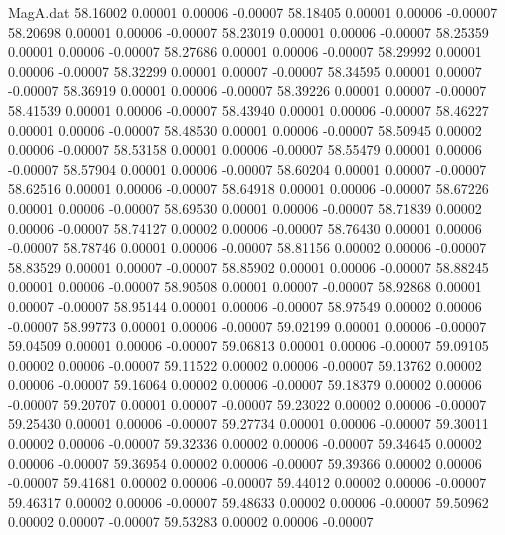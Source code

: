 \begin{filecontents}{MagA.dat}
  58.16002    0.00001    0.00006   -0.00007
  58.18405    0.00001    0.00006   -0.00007
  58.20698    0.00001    0.00006   -0.00007
  58.23019    0.00001    0.00006   -0.00007
  58.25359    0.00001    0.00006   -0.00007
  58.27686    0.00001    0.00006   -0.00007
  58.29992    0.00001    0.00006   -0.00007
  58.32299    0.00001    0.00007   -0.00007
  58.34595    0.00001    0.00007   -0.00007
  58.36919    0.00001    0.00006   -0.00007
  58.39226    0.00001    0.00007   -0.00007
  58.41539    0.00001    0.00006   -0.00007
  58.43940    0.00001    0.00006   -0.00007
  58.46227    0.00001    0.00006   -0.00007
  58.48530    0.00001    0.00006   -0.00007
  58.50945    0.00002    0.00006   -0.00007
  58.53158    0.00001    0.00006   -0.00007
  58.55479    0.00001    0.00006   -0.00007
  58.57904    0.00001    0.00006   -0.00007
  58.60204    0.00001    0.00007   -0.00007
  58.62516    0.00001    0.00006   -0.00007
  58.64918    0.00001    0.00006   -0.00007
  58.67226    0.00001    0.00006   -0.00007
  58.69530    0.00001    0.00006   -0.00007
  58.71839    0.00002    0.00006   -0.00007
  58.74127    0.00002    0.00006   -0.00007
  58.76430    0.00001    0.00006   -0.00007
  58.78746    0.00001    0.00006   -0.00007
  58.81156    0.00002    0.00006   -0.00007
  58.83529    0.00001    0.00007   -0.00007
  58.85902    0.00001    0.00006   -0.00007
  58.88245    0.00001    0.00006   -0.00007
  58.90508    0.00001    0.00007   -0.00007
  58.92868    0.00001    0.00007   -0.00007
  58.95144    0.00001    0.00006   -0.00007
  58.97549    0.00002    0.00006   -0.00007
  58.99773    0.00001    0.00006   -0.00007
  59.02199    0.00001    0.00006   -0.00007
  59.04509    0.00001    0.00006   -0.00007
  59.06813    0.00001    0.00006   -0.00007
  59.09105    0.00002    0.00006   -0.00007
  59.11522    0.00002    0.00006   -0.00007
  59.13762    0.00002    0.00006   -0.00007
  59.16064    0.00002    0.00006   -0.00007
  59.18379    0.00002    0.00006   -0.00007
  59.20707    0.00001    0.00007   -0.00007
  59.23022    0.00002    0.00006   -0.00007
  59.25430    0.00001    0.00006   -0.00007
  59.27734    0.00001    0.00006   -0.00007
  59.30011    0.00002    0.00006   -0.00007
  59.32336    0.00002    0.00006   -0.00007
  59.34645    0.00002    0.00006   -0.00007
  59.36954    0.00002    0.00006   -0.00007
  59.39366    0.00002    0.00006   -0.00007
  59.41681    0.00002    0.00006   -0.00007
  59.44012    0.00002    0.00006   -0.00007
  59.46317    0.00002    0.00006   -0.00007
  59.48633    0.00002    0.00006   -0.00007
  59.50962    0.00002    0.00007   -0.00007
  59.53283    0.00002    0.00006   -0.00007

\end{filecontents}
